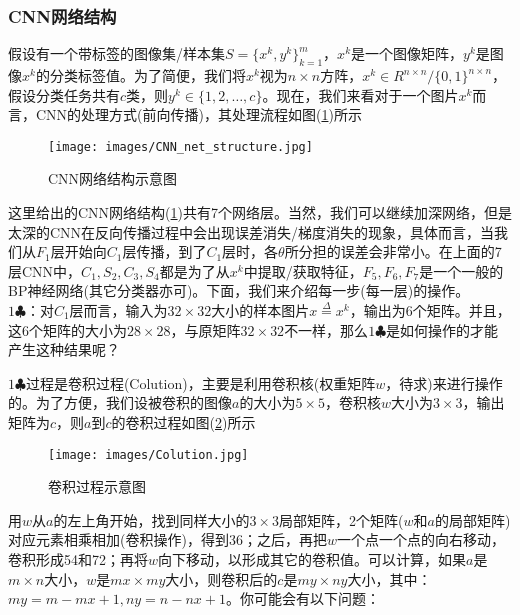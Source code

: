        \subsubsection{CNN网络结构}
            \par
            假设有一个带标签的图像集/样本集$S = \{x^k,y^k\}_{k=1}^m$，$x^k$是一个图像矩阵，$y^k$是图像$x^k$的分类标签值。为了简便，我们将$x^k$视为$n\times n$方阵，$x^k\in R^{n\times n}/\{0,1\}^{n\times n}$，假设分类任务共有$c$类，则$y^k\in \{1,2,\dots,c\}$。现在，我们来看对于一个图片$x^k$而言，CNN的处理方式(前向传播)，其处理流程如图(\ref{fig:CNN网络结构示意图})所示
            \begin{figure}[H]
            \centering
            \texttt{[image: images/CNN\_net\_structure.jpg]}
            \caption{CNN网络结构示意图}
            \label{fig:CNN网络结构示意图}
            \end{figure}
            \par
            这里给出的CNN网络结构(\ref{fig:CNN网络结构示意图})共有7个网络层。当然，我们可以继续加深网络，但是太深的CNN在反向传播过程中会出现误差消失/梯度消失的现象，具体而言，当我们从$F_1$层开始向$C_1$层传播，到了$C_1$层时，各$\theta$所分担的误差会非常小。在上面的7层CNN中，$C_1,S_2,C_3,S_4$都是为了从$x^k$中提取/获取特征，$F_5,F_6,F_7$是一个一般的BP神经网络(其它分类器亦可)。下面，我们来介绍每一步(每一层)的操作。\\
            $1\clubsuit$：对$C_1$层而言，输入为$32\times 32$大小的样本图片$x \overset{\Delta}{=}x^k$，输出为$6$个矩阵。并且，这6个矩阵的大小为$28\times 28$，与原矩阵$32\times 32$不一样，那么$1\clubsuit$是如何操作的才能产生这种结果呢？
            \par
            $1\clubsuit$过程是卷积过程(Colution)，主要是利用卷积核(权重矩阵$w$，待求)来进行操作的。为了方便，我们设被卷积的图像$a$的大小为$5\times 5$，卷积核$w$大小为$3\times 3$，输出矩阵为$c$，则$a$到$c$的卷积过程如图(\ref{fig:卷积过程示意图})所示
            \begin{figure}[H]
            \centering
            \texttt{[image: images/Colution.jpg]}
            \caption{卷积过程示意图}
            \label{fig:卷积过程示意图}
            \end{figure}
            用$w$从$a$的左上角开始，找到同样大小的$3\times 3$局部矩阵，2个矩阵($w$和$a$的局部矩阵)对应元素相乘相加(卷积操作)，得到36；之后，再把$w$一个点一个点的向右移动，卷积形成54和72；再将$w$向下移动，以形成其它的卷积值。可以计算，如果$a$是$m\times n$大小，$w$是$mx\times my$大小，则卷积后的$c$是$my\times ny$大小，其中：$my = m-mx+1,ny= n-nx+1$。你可能会有以下问题：
